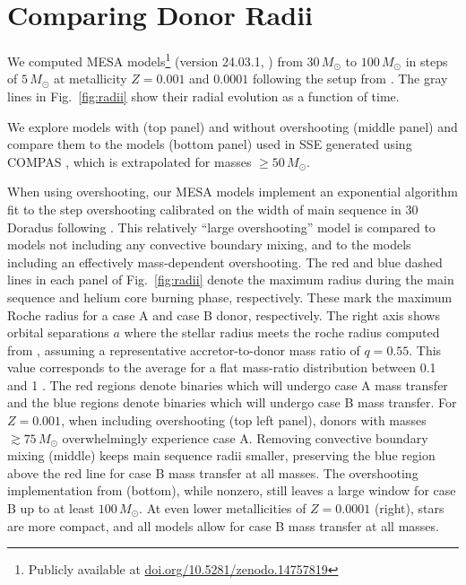 \documentclass[twocolumn]{aastex63}
\DeclareRobustCommand{\Figref}[1]{Fig.~\ref{#1}}
\begin{document}
\section{Comparing Donor Radii}

We computed \textsc{MESA} models\footnote{Publicly available at
  \href{https://doi.org/10.5281/zenodo.14757819}{doi.org/10.5281/zenodo.14757819}}
(version 24.03.1, \citealt{paxton:11, paxton:13, paxton:15, paxton:18,
  paxton:19, jermyn:23}) from $30 \, M_{\odot}$ to $100 \, M_{\odot}$
in steps of $5\,M_\odot$ at metallicity $Z=0.001$ and $0.0001$
following the setup from \cite{renzo:23}. The gray lines in
\Figref{fig:radii} show their radial evolution as a function of time.

We explore models with (top panel) and without overshooting (middle
panel) and compare them to the \cite{pols:98} models (bottom panel)
used in \textsc{SSE} \citep{hurley:00} generated using \textsc{COMPAS}
\citep{stevenson:17, vignagomez:18, riley:22}, which is extrapolated for
masses $\geq50\,M_\odot$.

When using overshooting, our \textsc{MESA} models implement an
exponential algorithm \citep{herwig:00} fit to the step overshooting
calibrated on the width of main sequence in 30 Doradus
\citep{brott:11} following \cite{claret:18}. This relatively ``large
overshooting'' model is compared to models not including any
convective boundary mixing, and to the \cite{pols:98} models including
an effectively mass-dependent overshooting. The red and blue dashed
lines in each panel of \Figref{fig:radii} denote the maximum radius
during the main sequence and helium core burning phase,
respectively. These mark the maximum Roche radius for a case A and
case B donor, respectively. The right axis shows orbital separations
$a$ where the stellar radius meets the roche radius computed from
\citet{eggleton:83}, assuming a representative accretor-to-donor mass
ratio of $q=0.55$. This value corresponds to the average for a flat
mass-ratio distribution between 0.1 and 1
\citep{kobulnicky:07,sana:12}. The red regions denote binaries which
will undergo case A mass transfer and the blue regions denote binaries
which will undergo case B mass transfer. For $Z=0.001$, when including
overshooting (top left panel), donors with masses
$ \gtrsim 75 \, M_{\odot}$ overwhelmingly experience case A.  Removing
convective boundary mixing (middle) keeps main sequence radii smaller,
preserving the blue region above the red line for case B mass transfer
at all masses. The overshooting implementation from \cite{pols:98}
(bottom), while nonzero, still leaves a large window for case B up to
at least $100 \, M_{\odot}$. At even lower metallicities of $Z=0.0001$
(right), stars are more compact, and all models allow for case B mass
transfer at all masses.
\end{document}
